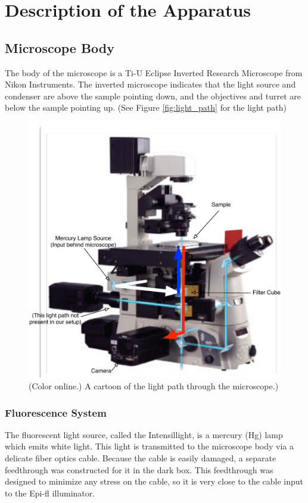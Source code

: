 \documentclass[11pt]{article}
\begin{document}
\section{Description of the Apparatus}
\subsection{Microscope Body}
The body of the microscope is a Ti-U Eclipse Inverted Research Microscope from Nikon Instruments.  The inverted microscope indicates that the light source and condenser are above the sample pointing down, and the objectives and turret are below the sample pointing up.  (See Figure \ref{fig:light_path} for the light path)
\begin{figure}[h!p]
\centering
\includegraphics[width=\textwidth]{misc_plots/microscope-light-path.pdf}
\caption[Light Path]{(Color online.)  A cartoon of the light path through the microscope.)}
\label{fig:lightpath}
\end{figure}


\subsubsection{Fluorescence System}
The fluorescent light source, called the Intensillight, is a mercury (Hg) lamp which emits white light.  This light is transmitted to the microscope body via a delicate fiber optics cable.  Because the cable is easily damaged, a separate feedthrough was constructed for it in the dark box.  This feedthrough was designed to minimize any stress on the cable, so it is very close to the cable input to the Epi-fl illuminator.  
\end{document}
